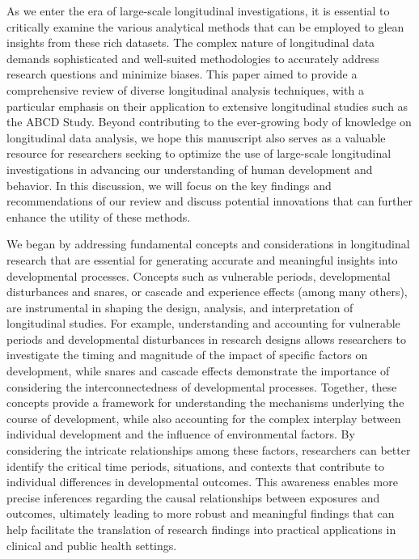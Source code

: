 \documentclass[
  number,
  preprint,
  3p,
  twocolumn]{elsarticle}
\begin{document}
\label{sec:headings}

As we enter the era of large-scale longitudinal investigations, it is
essential to critically examine the various analytical methods that can
be employed to glean insights from these rich datasets. The complex
nature of longitudinal data demands sophisticated and well-suited
methodologies to accurately address research questions and minimize
biases. This paper aimed to provide a comprehensive review of diverse
longitudinal analysis techniques, with a particular emphasis on their
application to extensive longitudinal studies such as the ABCD Study.
Beyond contributing to the ever-growing body of knowledge on
longitudinal data analysis, we hope this manuscript also serves as a
valuable resource for researchers seeking to optimize the use of
large-scale longitudinal investigations in advancing our understanding
of human development and behavior. In this discussion, we will focus on
the key findings and recommendations of our review and discuss potential
innovations that can further enhance the utility of these methods.

We began by addressing fundamental concepts and considerations in
longitudinal research that are essential for generating accurate and
meaningful insights into developmental processes. Concepts such as
vulnerable periods, developmental disturbances and snares, or cascade
and experience effects (among many others), are instrumental in shaping
the design, analysis, and interpretation of longitudinal studies. For
example, understanding and accounting for vulnerable periods and
developmental disturbances in research designs allows researchers to
investigate the timing and magnitude of the impact of specific factors
on development, while snares and cascade effects demonstrate the
importance of considering the interconnectedness of developmental
processes. Together, these concepts provide a framework for
understanding the mechanisms underlying the course of development, while
also accounting for the complex interplay between individual development
and the influence of environmental factors. By considering the intricate
relationships among these factors, researchers can better identify the
critical time periods, situations, and contexts that contribute to
individual differences in developmental outcomes. This awareness enables
more precise inferences regarding the causal relationships between
exposures and outcomes, ultimately leading to more robust and meaningful
findings that can help facilitate the translation of research findings
into practical applications in clinical and public health settings.
\end{document}
